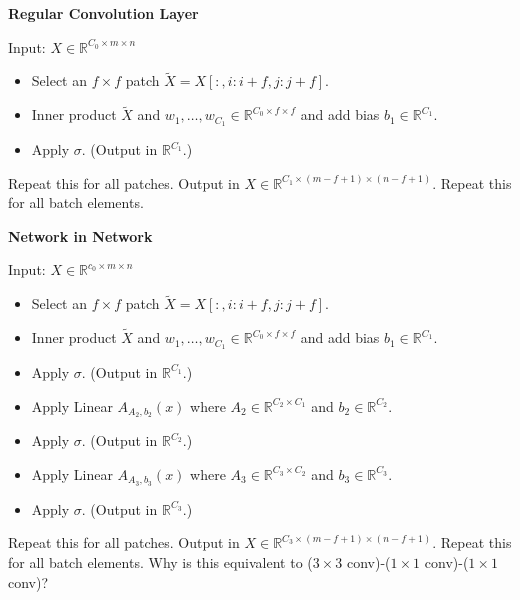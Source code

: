 \begin{concept}
    \textbf{Regular Convolution Layer}

    Input: $X \in \mathbb{R}^{C_{0} \times m \times n}$

    \begin{itemize}
        \item Select an $f \times f$ patch $\tilde{X}=X[:, i: i+f, j: j+f]$.
        \item Inner product $\tilde{X}$ and $w_{1}, \ldots, w_{C_{1}} \in \mathbb{R}^{C_{0} \times f \times f}$ and add bias $b_{1} \in \mathbb{R}^{C_{1}}$.
        \item Apply $\sigma$. (Output in $\mathbb{R}^{C_{1}}$.)
    \end{itemize}

    Repeat this for all patches. Output in $X \in \mathbb{R}^{C_{1} \times(m-f+1) \times(n-f+1)}$.
    Repeat this for all batch elements.

    \par\noindent\textcolor{gray}{\hdashrule{\textwidth}{0.4pt}{1pt 2pt}}

    \textbf{Network in Network}

    Input: $X \in \mathbb{R}^{c_{0} \times m \times n}$

    \begin{itemize}
        \item Select an $f \times f$ patch $\tilde{X}=X[:, i: i+f, j: j+f]$.
        \item Inner product $\tilde{X}$ and $w_{1}, \ldots, w_{C_{1}} \in \mathbb{R}^{C_{0} \times f \times f}$ and add bias $b_{1} \in \mathbb{R}^{C_{1}}$.
        \item Apply $\sigma$. (Output in $\mathbb{R}^{C_{1}}$.)
        \item Apply Linear $A_{A_{2}, b_{2}}(x)$ where $A_{2} \in \mathbb{R}^{C_{2} \times C_{1}}$ and $b_{2} \in \mathbb{R}^{C_{2}}$.
        \item Apply $\sigma$. (Output in $\mathbb{R}^{C_{2}}$.)
        \item Apply Linear $A_{A_{3}, b_{3}}(x)$ where $A_{3} \in \mathbb{R}^{C_{3} \times C_{2}}$ and $b_{3} \in \mathbb{R}^{C_{3}}$.
        \item Apply $\sigma$. (Output in $\mathbb{R}^{C_{3}}$.)
    \end{itemize}

    Repeat this for all patches. Output in $X \in \mathbb{R}^{C_{3} \times(m-f+1) \times(n-f+1)}$. Repeat this for all batch elements.
    Why is this equivalent to ($3 \times 3$ conv)-($1 \times 1$ conv)-($1 \times 1$ conv)?
\end{concept}

